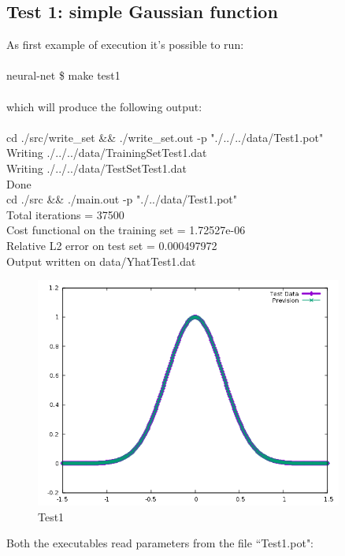 \documentclass[12pt, a4paper]{report}
\theoremstyle{definition}
\begin{document}
\subsection{Test 1: simple Gaussian function}
As first example of execution it's possible to run:\\
{\\ \ttfamily neural-net \$ make test1\\}
\\ which will produce the following output:\\
{\\ \ttfamily 
	cd ./src/write\_set \&\& ./write\_set.out -p "./../../data/Test1.pot"\\
	Writing ./../../data/TrainingSetTest1.dat\\
	Writing ./../../data/TestSetTest1.dat\\
	Done\\
	cd ./src \&\& ./main.out -p "./../data/Test1.pot"\\
	Total iterations = 37500\\
	Cost functional on the training set = 1.72527e-06\\
	Relative L2 error on test set = 0.000497972\\
	Output written on data/YhatTest1.dat\\
}
\begin{figure}[H]
	\centering
	\includegraphics[width=0.9\textwidth]{img/Test1} 
	\caption{Test1}
\end{figure}
\noindent Both the executables read parameters from the file ``Test1.pot":
\end{document}
